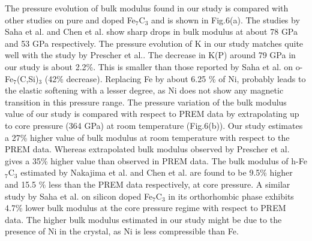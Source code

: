 \documentclass[prb,aps,preprint]{revtex4-2}
\begin{document}
The pressure evolution of bulk modulus found in our study is compared with other studies on pure and doped Fe$_{7}$C$_{3}$ and is shown in Fig.6(a). The studies by Saha et al.\cite{saha2021synthesis} and Chen et al.\cite{chen2012magneto} show sharp drops in bulk modulus at about 78 GPa and 53 GPa respectively.  The pressure evolution of K in our study matches quite well with the study by Prescher et al.\cite{prescher2015high}. The decrease in K(P) around 79 GPa in our study is about 2.2\%. This is smaller than those reported by Saha et al. on o-Fe$_{7}$(C,Si)$_{3}$ (42\% decrease). Replacing Fe by about 6.25 \% of Ni, probably leads to the elastic softening with a lesser degree, as Ni does not show any magnetic transition in this pressure range.
The pressure variation of the bulk modulus value of our study is compared with respect to PREM data by extrapolating up to core pressure (364 GPa) at room temperature (Fig.6(b)). Our study estimates a 27\% higher value of bulk modulus at room temperature with respect to the PREM data. Whereas extrapolated bulk modulus observed by Prescher et al.\cite{prescher2015high} gives a 35\% higher value than observed in PREM data. The bulk modulus of h-Fe$_{7}$C$_{3}$ estimated by Nakajima et al. \cite{nakajima2011thermoelastic,chen2012magneto} and Chen et al. are found to be 9.5\% higher and 15.5 \% less than the PREM data respectively, at core pressure. A similar study by Saha et al. on silicon doped Fe$_{7}$C$_{3}$ in its orthorhombic phase exhibits 4.7\% lower bulk modulus at the core pressure regime with respect to PREM data. The higher bulk modulus estimated in our study might be due to the presence of Ni in the crystal, as Ni is less compressible than Fe\cite{hirao2022equations}. 
\newpage
\end{document}
